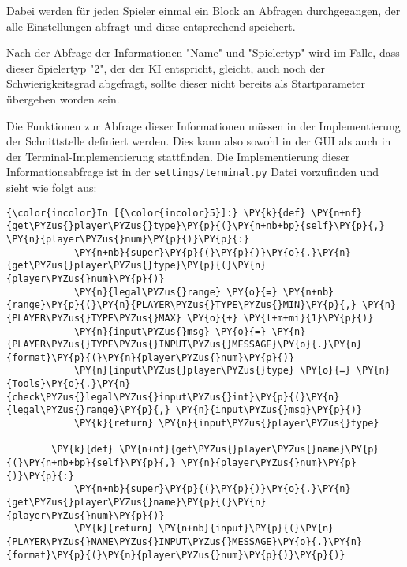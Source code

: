     Dabei werden für jeden Spieler einmal ein Block an Abfragen
durchgegangen, der alle Einstellungen abfragt und diese entsprechend
speichert.

Nach der Abfrage der Informationen "Name" und "Spielertyp" wird im
Falle, dass dieser Spielertyp "2", der der KI entspricht, gleicht, auch
noch der Schwierigkeitsgrad abgefragt, sollte dieser nicht bereits als
Startparameter übergeben worden sein.

Die Funktionen zur Abfrage dieser Informationen müssen in der
Implementierung der Schnittstelle definiert werden. Dies kann also
sowohl in der GUI als auch in der Terminal-Implementierung stattfinden. Die
Implementierung dieser Informationsabfrage ist in der
\texttt{settings/terminal.py} Datei vorzufinden und sieht wie folgt aus:

    \begin{Verbatim}[commandchars=\\\{\}]
{\color{incolor}In [{\color{incolor}5}]:} \PY{k}{def} \PY{n+nf}{get\PYZus{}player\PYZus{}type}\PY{p}{(}\PY{n+nb+bp}{self}\PY{p}{,} \PY{n}{player\PYZus{}num}\PY{p}{)}\PY{p}{:}
            \PY{n+nb}{super}\PY{p}{(}\PY{p}{)}\PY{o}{.}\PY{n}{get\PYZus{}player\PYZus{}type}\PY{p}{(}\PY{n}{player\PYZus{}num}\PY{p}{)}
            \PY{n}{legal\PYZus{}range} \PY{o}{=} \PY{n+nb}{range}\PY{p}{(}\PY{n}{PLAYER\PYZus{}TYPE\PYZus{}MIN}\PY{p}{,} \PY{n}{PLAYER\PYZus{}TYPE\PYZus{}MAX} \PY{o}{+} \PY{l+m+mi}{1}\PY{p}{)}
            \PY{n}{input\PYZus{}msg} \PY{o}{=} \PY{n}{PLAYER\PYZus{}TYPE\PYZus{}INPUT\PYZus{}MESSAGE}\PY{o}{.}\PY{n}{format}\PY{p}{(}\PY{n}{player\PYZus{}num}\PY{p}{)}
            \PY{n}{input\PYZus{}player\PYZus{}type} \PY{o}{=} \PY{n}{Tools}\PY{o}{.}\PY{n}{check\PYZus{}legal\PYZus{}input\PYZus{}int}\PY{p}{(}\PY{n}{legal\PYZus{}range}\PY{p}{,} \PY{n}{input\PYZus{}msg}\PY{p}{)}
            \PY{k}{return} \PY{n}{input\PYZus{}player\PYZus{}type}
        
        \PY{k}{def} \PY{n+nf}{get\PYZus{}player\PYZus{}name}\PY{p}{(}\PY{n+nb+bp}{self}\PY{p}{,} \PY{n}{player\PYZus{}num}\PY{p}{)}\PY{p}{:}
            \PY{n+nb}{super}\PY{p}{(}\PY{p}{)}\PY{o}{.}\PY{n}{get\PYZus{}player\PYZus{}name}\PY{p}{(}\PY{n}{player\PYZus{}num}\PY{p}{)}
            \PY{k}{return} \PY{n+nb}{input}\PY{p}{(}\PY{n}{PLAYER\PYZus{}NAME\PYZus{}INPUT\PYZus{}MESSAGE}\PY{o}{.}\PY{n}{format}\PY{p}{(}\PY{n}{player\PYZus{}num}\PY{p}{)}\PY{p}{)}
        

\end{Verbatim}
